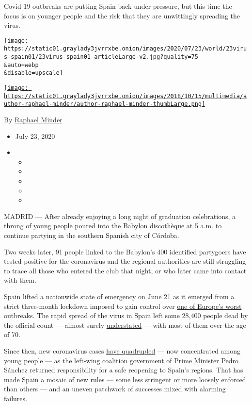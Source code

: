 Covid-19 outbreaks are putting Spain back under pressure, but this time
the focus is on younger people and the risk that they are unwittingly
spreading the virus.

\texttt{[image: https://static01.graylady3jvrrxbe.onion/images/2020/07/23/world/23virus-spain01/23virus-spain01-articleLarge-v2.jpg?quality=75\\\&auto=webp\\\&disable=upscale]}

\href{https://www.nytimes3xbfgragh.onion/by/raphael-minder}{\texttt{[image: https://static01.graylady3jvrrxbe.onion/images/2018/10/15/multimedia/author-raphael-minder/author-raphael-minder-thumbLarge.png]}}

By \href{https://www.nytimes3xbfgragh.onion/by/raphael-minder}{Raphael
Minder}

\begin{itemize}
\item
  July 23, 2020
\item
  \begin{itemize}
  \item
  \item
  \item
  \item
  \item
  \end{itemize}
\end{itemize}

MADRID --- After already enjoying a long night of graduation
celebrations, a throng of young people poured into the Babylon
discothèque at 5 a.m. to continue partying in the southern Spanish city
of Córdoba.

Two weeks later, 91 people linked to the Babylon's 400 identified
partygoers have tested positive for the coronavirus and the regional
authorities are still struggling to trace all those who entered the club
that night, or who later came into contact with them.

Spain lifted a nationwide state of emergency on June 21 as it emerged
from a strict three-month lockdown imposed to gain control over
\href{https://www.nytimes3xbfgragh.onion/2020/04/07/world/europe/spain-coronavirus.html?searchResultPosition=150}{one
of Europe's worst} outbreaks. The rapid spread of the virus in Spain
left some 28,400 people dead by the official count --- almost surely
\href{https://www.nytimes3xbfgragh.onion/2020/04/16/world/europe/coronoavirus-spain-death-toll.html?searchResultPosition=136}{understated}
--- with most of them over the age of 70.

Since then, new coronavirus cases
\href{https://www.nytimes3xbfgragh.onion/interactive/2020/world/europe/spain-coronavirus-cases.html}{have
quadrupled} --- now concentrated among young people --- as the left-wing
coalition government of Prime Minister Pedro Sánchez returned
responsibility for a safe reopening to Spain's regions. That has made
Spain a mosaic of new rules --- some less stringent or more loosely
enforced than others --- and an uneven patchwork of successes mixed with
alarming failures.

